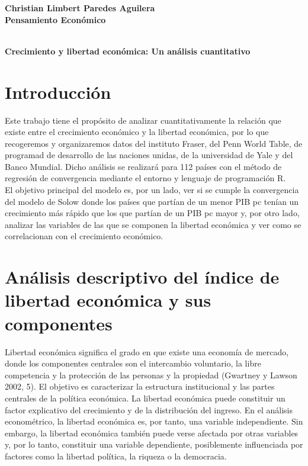 \textbf{Christian Limbert Paredes Aguilera}\\
\textbf{Pensamiento Económico}\\\\
\begin{center}
\textbf{\Large Crecimiento y libertad económica: Un análisis cuantitativo}\\
\end{center}
\vspace{1cm}

    \section*{Introducción}
    Este trabajo tiene el propósito de analizar cuantitativamente la relación que existe entre el crecimiento económico y la libertad económica, por lo que recogeremos y organizaremos datos del instituto Fraser, del Penn World Table, de programad de desarrollo de las naciones unidas, de la universidad de Yale y del Banco Mundial. Dicho análisis se realizará para 112 países con el método de regresión de convergencia mediante  el entorno y lenguaje de programación R.\\
    El objetivo principal del modelo es, por un lado, ver si se cumple la convergencia del modelo de Solow donde los países que partían de un menor PIB pc tenían un crecimiento más rápido que los que partían de un PIB pc mayor y, por otro lado, analizar las variables de las que se componen la libertad económica y ver como se correlacionan con el crecimiento económico.

    \section*{Análisis descriptivo del índice de libertad económica y sus componentes}

    Libertad económica significa el grado en que existe una economía de mercado, donde los componentes centrales son el intercambio voluntario, la libre competencia y la protección de las personas y la propiedad (Gwartney y Lawson 2002, 5). El objetivo es caracterizar la estructura institucional y las partes centrales de la política económica. La libertad económica puede constituir un factor explicativo del crecimiento y de la distribución del ingreso. En el análisis econométrico, la libertad económica es, por tanto, una variable independiente. Sin embargo, la libertad económica también puede verse afectada por otras variables y, por lo tanto, constituir una variable dependiente, posiblemente influenciada por factores como la libertad política, la riqueza o la democracia.\\

